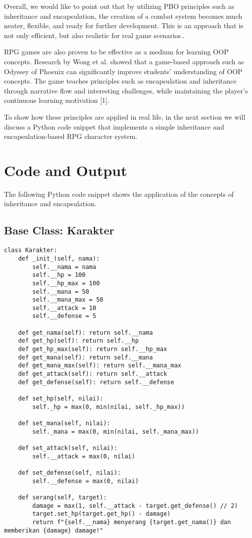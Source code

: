 \documentclass[12pt]{article}
\begin{document}
Overall, we would like to point out that by utilizing PBO principles such as inheritance and encapsulation, the creation of a combat system becomes much neater, flexible, and ready for further development. This is an approach that is not only efficient, but also realistic for real game scenarios..
\vspace*{0.5cm}

RPG games are also proven to be effective as a medium for learning OOP concepts. Research by Wong et al. showed that a game-based approach such as Odyssey of Phoenix can significantly improve students' understanding of OOP concepts. The game teaches principles such as encapsulation and inheritance through narrative flow and interesting challenges, while maintaining the player's continuous learning motivation [1].

\vspace*{0.5cm}

To show how these principles are applied in real life, in the next section we will discuss a Python code snippet that implements a simple inheritance and encapsulation-based RPG character system.
\vspace*{3.5cm}

\section{Code and Output}
The following Python code snippet shows the application of the concepts of inheritance and encapsulation.

\subsection*{Base Class: Karakter}
\begin{verbatim}
class Karakter:
    def _init_(self, nama):
        self.__nama = nama
        self.__hp = 100
        self.__hp_max = 100
        self.__mana = 50
        self.__mana_max = 50
        self.__attack = 10
        self.__defense = 5

    def get_nama(self): return self.__nama
    def get_hp(self): return self.__hp
    def get_hp_max(self): return self.__hp_max
    def get_mana(self): return self.__mana
    def get_mana_max(self): return self.__mana_max
    def get_attack(self): return self.__attack
    def get_defense(self): return self.__defense

    def set_hp(self, nilai):
        self._hp = max(0, min(nilai, self._hp_max))

    def set_mana(self, nilai):
        self._mana = max(0, min(nilai, self._mana_max))

    def set_attack(self, nilai):
        self.__attack = max(0, nilai)

    def set_defense(self, nilai):
        self.__defense = max(0, nilai)

    def serang(self, target):
        damage = max(1, self.__attack - target.get_defense() // 2)
        target.set_hp(target.get_hp() - damage)
        return f"{self.__nama} menyerang {target.get_nama()} dan memberikan {damage} damage!"
\end{verbatim}
\end{document}
